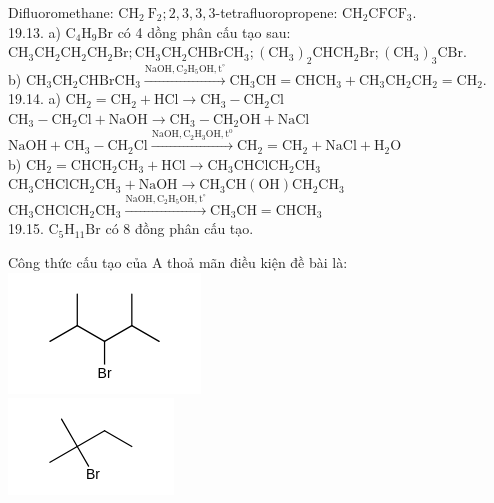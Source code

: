 \documentclass[10pt]{article}
\begin{document}
Difluoromethane: $\mathrm{CH}_{2} \mathrm{~F}_{2} ; 2,3,3,3$-tetrafluoropropene: $\mathrm{CH}_{2} \mathrm{CFCF}_{3}$.\\
19.13. a) $\mathrm{C}_{4} \mathrm{H}_{9} \mathrm{Br}$ có 4 dồng phân cấu tạo sau:\\
$\mathrm{CH}_{3} \mathrm{CH}_{2} \mathrm{CH}_{2} \mathrm{CH}_{2} \mathrm{Br} ; \mathrm{CH}_{3} \mathrm{CH}_{2} \mathrm{CHBrCH}_{3} ;\left(\mathrm{CH}_{3}\right)_{2} \mathrm{CHCH}_{2} \mathrm{Br} ;\left(\mathrm{CH}_{3}\right)_{3} \mathrm{CBr}$.\\
b) $\mathrm{CH}_{3} \mathrm{CH}_{2} \mathrm{CHBrCH}_{3} \xrightarrow{\mathrm{NaOH}, \mathrm{C}_{2} \mathrm{H}_{5} \mathrm{OH}, \mathrm{t}^{\circ}} \mathrm{CH}_{3} \mathrm{CH}=\mathrm{CHCH}_{3}+\mathrm{CH}_{3} \mathrm{CH}_{2} \mathrm{CH}_{2}=\mathrm{CH}_{2}$.\\
19.14. a) $\mathrm{CH}_{2}=\mathrm{CH}_{2}+\mathrm{HCl} \longrightarrow \mathrm{CH}_{3}-\mathrm{CH}_{2} \mathrm{Cl}$\\
$\mathrm{CH}_{3}-\mathrm{CH}_{2} \mathrm{Cl}+\mathrm{NaOH} \longrightarrow \mathrm{CH}_{3}-\mathrm{CH}_{2} \mathrm{OH}+\mathrm{NaCl}$\\
$\mathrm{NaOH}+\mathrm{CH}_{3}-\mathrm{CH}_{2} \mathrm{Cl} \xrightarrow{\mathrm{NaOH}, \mathrm{C}_{2} \mathrm{H}_{3} \mathrm{OH}, \mathrm{t}^{\mathrm{o}}} \mathrm{CH}_{2}=\mathrm{CH}_{2}+\mathrm{NaCl}+\mathrm{H}_{2} \mathrm{O}$\\
b) $\mathrm{CH}_{2}=\mathrm{CHCH}_{2} \mathrm{CH}_{3}+\mathrm{HCl} \longrightarrow \mathrm{CH}_{3} \mathrm{CHClCH}_{2} \mathrm{CH}_{3}$\\
$\mathrm{CH}_{3} \mathrm{CHClCH}_{2} \mathrm{CH}_{3}+\mathrm{NaOH} \longrightarrow \mathrm{CH}_{3} \mathrm{CH}(\mathrm{OH}) \mathrm{CH}_{2} \mathrm{CH}_{3}$\\
$\mathrm{CH}_{3} \mathrm{CHClCH}_{2} \mathrm{CH}_{3} \xrightarrow{\mathrm{NaOH}, \mathrm{C}_{2} \mathrm{H}_{5} \mathrm{OH}, \mathrm{t}^{\circ}} \mathrm{CH}_{3} \mathrm{CH}=\mathrm{CHCH}_{3}$\\
19.15. $\mathrm{C}_{5} \mathrm{H}_{11} \mathrm{Br}$ có 8 đồng phân cấu tạo.

Công thức cấu tạo của A thoả mãn điều kiện đề bài là:\\
\includegraphics{smile-7d3825c168f17eede8b9277f53f479ab713f0091}\\
\includegraphics{smile-9ca530a75c10d27d536153a47e79375a94ce8fea}
\end{document}
